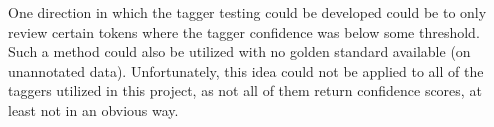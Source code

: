 One direction in which the tagger testing could be developed could be to only review certain tokens where the tagger confidence was below some threshold. Such a method could also be utilized with no golden standard available (on unannotated data). Unfortunately, this idea could not be applied to all of the taggers utilized in this project, as not all of them return confidence scores, at least not in an obvious way.